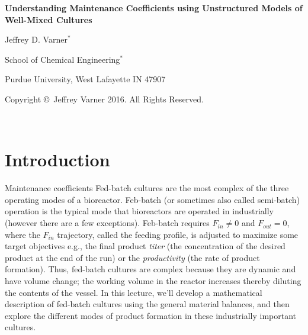 \documentclass[11pt]{article}
\theoremstyle{definition}
\begin{document}
{\par\centering\textbf{\Large Understanding Maintenance Coefficients using Unstructured Models of Well-Mixed Cultures}}
\vspace{0.2in}
{\par \centering \large{Jeffrey D. Varner$^{*}$}}
\vspace{0.05in}
{\par \centering \large{School of Chemical Engineering$^{*}$}}
{\par \centering \large{Purdue University, West Lafayette IN 47907}}
\vspace{0.1in}
{\par \centering \small{Copyright \copyright\ Jeffrey Varner 2016. All Rights Reserved.}}\\

\date{}
\thispagestyle{empty}

\setcounter{page}{1}


\section*{Introduction}
Maintenance coefficients 
Fed-batch cultures are the most complex of the three operating modes of a bioreactor.
Feb-batch (or sometimes also called semi-batch) operation is the typical mode that bioreactors are operated in industrially (however there are a few exceptions).
Feb-batch requires $F_{in}\neq{0}$ and $F_{out} = 0$, where the $F_{in}$ trajectory, called the feeding profile, is adjusted to maximize some target objectives e.g.,
the final product \emph{titer} (the concentration of the desired product at the end of the run) or the
\emph{productivity} (the rate of product formation). Thus, fed-batch cultures are complex because they are dynamic and have volume change;
the working volume in the reactor increases thereby diluting the contents of the vessel.
In this lecture, we'll develop a mathematical description of
fed-batch cultures using the general material balances, and then explore the different modes of product formation in these industrially important cultures.
\end{document}
